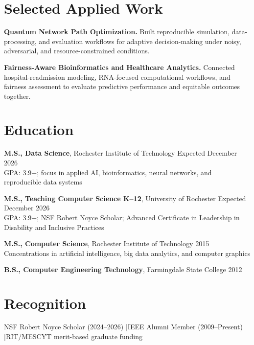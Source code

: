 \documentclass[10pt,letterpaper]{article}
\begin{document}
\section*{Selected Applied Work}
\textbf{Quantum Network Path Optimization.}
Built reproducible simulation, data-processing, and evaluation workflows for
adaptive decision-making under noisy, adversarial, and resource-constrained
conditions.

\textbf{Fairness-Aware Bioinformatics and Healthcare Analytics.}
Connected hospital-readmission modeling, RNA-focused computational workflows,
and fairness assessment to evaluate predictive performance and equitable
outcomes together.

\section*{Education}
\textbf{M.S., Data Science}, Rochester Institute of Technology
\hfill Expected December 2026\\
GPA: 3.9+; focus in applied AI, bioinformatics, neural networks, and
reproducible data systems

\textbf{M.S., Teaching Computer Science K--12}, University of Rochester
\hfill Expected December 2026\\
GPA: 3.9+; NSF Robert Noyce Scholar; Advanced Certificate in Leadership in
Disability and Inclusive Practices

\textbf{M.S., Computer Science}, Rochester Institute of Technology
\hfill 2015\\
Concentrations in artificial intelligence, big data analytics, and computer
graphics

\textbf{B.S., Computer Engineering Technology}, Farmingdale State College
\hfill 2012

\section*{Recognition}
NSF Robert Noyce Scholar (2024--2026)
\enspace|\enspace IEEE Alumni Member (2009--Present)
\enspace|\enspace RIT/MESCYT merit-based graduate funding
\end{document}
